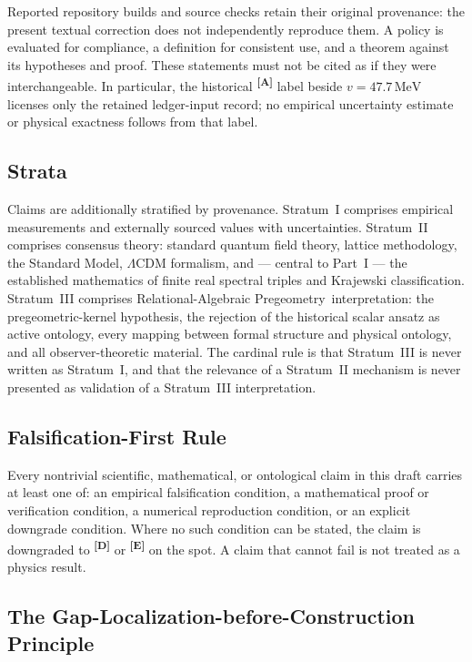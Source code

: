 \documentclass[12pt,a4paper,twoside]{article}
\theoremstyle{plain}
\theoremstyle{definition}
\theoremstyle{remark}
\newcommand{\ProjectShort}{Relational-Algebraic Pregeometry}
\newcommand{\RAP}{\ProjectShort}
\newcommand{\MeV}{\,\mathrm{MeV}}
\newcommand{\catmark}[1]{\textsuperscript{\textsf{\textbf{[#1]}}}}
\newcommand{\vVEV}{47.7\MeV} %
\begin{document}
Reported repository builds and source checks retain their original provenance:
the present textual correction does not independently reproduce them. A policy
is evaluated for compliance, a definition for consistent use, and a theorem
against its hypotheses and proof. These statements must not be cited as if they
were interchangeable. In particular, the historical \catmark{A} label beside
$v=\vVEV$ licenses only the retained ledger-input record; no empirical
uncertainty estimate or physical exactness follows from that label.

\subsection{Strata}
\label{subsec:strata}

Claims are additionally stratified by provenance. Stratum~I comprises
empirical measurements and externally sourced values with uncertainties.
Stratum~II comprises consensus theory: standard quantum field theory,
lattice methodology, the Standard Model, $\Lambda$CDM formalism, and ---
central to Part~I --- the established mathematics of finite real spectral
triples and Krajewski classification. Stratum~III comprises \RAP\
interpretation: the pregeometric-kernel hypothesis, the rejection of the historical scalar ansatz as active ontology,
every mapping between formal structure and physical ontology, and all
observer-theoretic material. The cardinal rule is that Stratum~III is
never written as Stratum~I, and that the relevance of a Stratum~II
mechanism is never presented as validation of a Stratum~III
interpretation.

\subsection{Falsification-First Rule}
\label{subsec:falsification-first}

Every nontrivial scientific, mathematical, or ontological claim in this
draft carries at least one of: an empirical falsification condition, a
mathematical proof or verification condition, a numerical reproduction
condition, or an explicit downgrade condition. Where no such condition can
be stated, the claim is downgraded to \catmark{D} or \catmark{E} on the
spot. A claim that cannot fail is not treated as a physics result.

\subsection{The Gap-Localization-before-Construction Principle}
\label{subsec:glbc}
\end{document}
